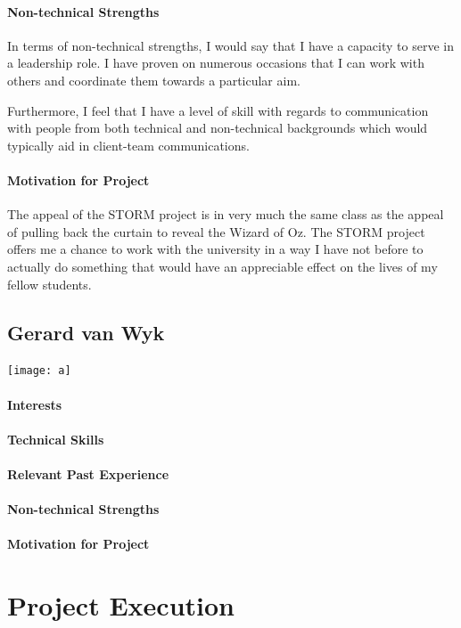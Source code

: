 \documentclass[12pt]{article}
\begin{document}
\paragraph{Non-technical Strengths}
In terms of non-technical strengths, I would say that I have a capacity to serve in a leadership role. I have proven on numerous occasions that I can work with others and coordinate them towards a particular aim.

Furthermore, I feel that I have a level of skill with regards to communication with people from both technical and non-technical backgrounds which would typically aid in client-team communications.
\paragraph{Motivation for Project}
The appeal of the STORM project is in very much the same class as the appeal of pulling back the curtain to reveal the Wizard of Oz. The STORM project offers me a chance to work with the university in a way I have not before to actually do something that would have an appreciable effect on the lives of my fellow students.
\subsection{Gerard van Wyk}
\texttt{[image: a]}
\paragraph{Interests}
\paragraph{Technical Skills}
\paragraph{Relevant Past Experience}
\paragraph{Non-technical Strengths}
\paragraph{Motivation for Project}

\section{Project Execution}
\end{document}
